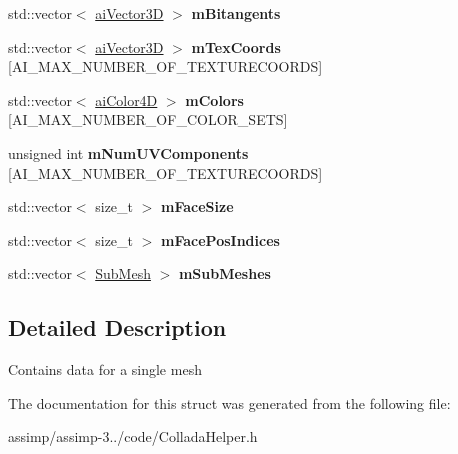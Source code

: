 \begin{DoxyCompactItemize}
\item 
\hypertarget{struct_assimp_1_1_collada_1_1_mesh_a9af0b24fbbf0047ee74ceb197494c33b}{std\+::vector$<$ \hyperlink{structai_vector3_d}{ai\+Vector3\+D} $>$ {\bfseries m\+Bitangents}}\label{struct_assimp_1_1_collada_1_1_mesh_a9af0b24fbbf0047ee74ceb197494c33b}

\item 
\hypertarget{struct_assimp_1_1_collada_1_1_mesh_ab4ab2e3980f33cfc5da543b9603ee0d3}{std\+::vector$<$ \hyperlink{structai_vector3_d}{ai\+Vector3\+D} $>$ {\bfseries m\+Tex\+Coords} \mbox{[}A\+I\+\_\+\+M\+A\+X\+\_\+\+N\+U\+M\+B\+E\+R\+\_\+\+O\+F\+\_\+\+T\+E\+X\+T\+U\+R\+E\+C\+O\+O\+R\+D\+S\mbox{]}}\label{struct_assimp_1_1_collada_1_1_mesh_ab4ab2e3980f33cfc5da543b9603ee0d3}

\item 
\hypertarget{struct_assimp_1_1_collada_1_1_mesh_ad7593a36cb35be3e6e80d4d89a508cb9}{std\+::vector$<$ \hyperlink{structai_color4_d}{ai\+Color4\+D} $>$ {\bfseries m\+Colors} \mbox{[}A\+I\+\_\+\+M\+A\+X\+\_\+\+N\+U\+M\+B\+E\+R\+\_\+\+O\+F\+\_\+\+C\+O\+L\+O\+R\+\_\+\+S\+E\+T\+S\mbox{]}}\label{struct_assimp_1_1_collada_1_1_mesh_ad7593a36cb35be3e6e80d4d89a508cb9}

\item 
\hypertarget{struct_assimp_1_1_collada_1_1_mesh_a69cc391dc6ca316d5594cdea0b1b938d}{unsigned int {\bfseries m\+Num\+U\+V\+Components} \mbox{[}A\+I\+\_\+\+M\+A\+X\+\_\+\+N\+U\+M\+B\+E\+R\+\_\+\+O\+F\+\_\+\+T\+E\+X\+T\+U\+R\+E\+C\+O\+O\+R\+D\+S\mbox{]}}\label{struct_assimp_1_1_collada_1_1_mesh_a69cc391dc6ca316d5594cdea0b1b938d}

\item 
\hypertarget{struct_assimp_1_1_collada_1_1_mesh_abad259765d83efe57e8f294d791490f0}{std\+::vector$<$ size\+\_\+t $>$ {\bfseries m\+Face\+Size}}\label{struct_assimp_1_1_collada_1_1_mesh_abad259765d83efe57e8f294d791490f0}

\item 
\hypertarget{struct_assimp_1_1_collada_1_1_mesh_abc6fa6fce9c9fa4844af6bfacd2e96b2}{std\+::vector$<$ size\+\_\+t $>$ {\bfseries m\+Face\+Pos\+Indices}}\label{struct_assimp_1_1_collada_1_1_mesh_abc6fa6fce9c9fa4844af6bfacd2e96b2}

\item 
\hypertarget{struct_assimp_1_1_collada_1_1_mesh_a74283c035b51eb04192c41a991a0124f}{std\+::vector$<$ \hyperlink{struct_assimp_1_1_collada_1_1_sub_mesh}{Sub\+Mesh} $>$ {\bfseries m\+Sub\+Meshes}}\label{struct_assimp_1_1_collada_1_1_mesh_a74283c035b51eb04192c41a991a0124f}

\end{DoxyCompactItemize}


\subsection{Detailed Description}
Contains data for a single mesh 

The documentation for this struct was generated from the following file\+:\begin{DoxyCompactItemize}
\item 
assimp/assimp-\/3../code/Collada\+Helper.\+h\end{DoxyCompactItemize}

